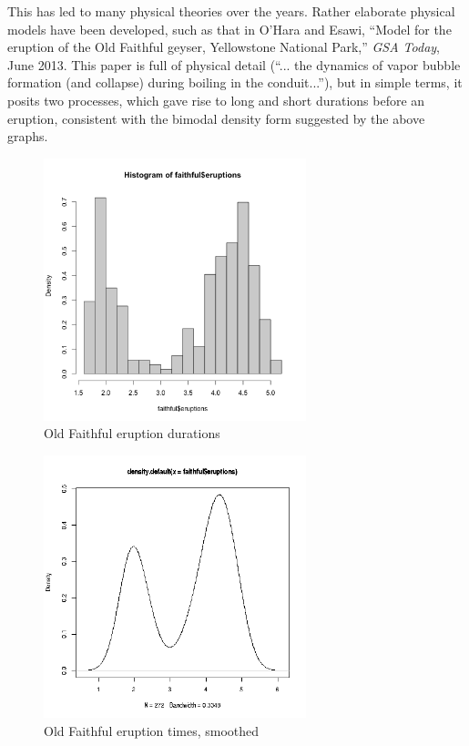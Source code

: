 \documentclass[11pt]{article}
\begin{document}
This has led to many physical theories over the years.  Rather elaborate
physical models have been developed, such as that in O'Hara and Esawi,
``Model for the eruption of the Old Faithful geyser, Yellowstone National
Park,'' \textit{GSA Today}, June 2013.  This paper is full of physical
detail (``... the dynamics of vapor bubble formation (and collapse)
during boiling in the conduit...''), but in simple terms, it posits two
processes, which gave rise to long and short durations before an
eruption, consistent with the bimodal density form suggested by the
above graphs.

\begin{figure}[tb]
\centerline{
\includegraphics[width=3.0in]{FaithfulDuration.png}
}
\caption{Old Faithful eruption durations}
\label{faithfulhist}
\end{figure}

\begin{figure}[tb]
\centerline{
\includegraphics[width=3.0in]{FaithfulDurationSmooth.png}
}
\caption{Old Faithful eruption times, smoothed}
\label{faithfulhistsmooth}
\end{figure}
\end{document}

